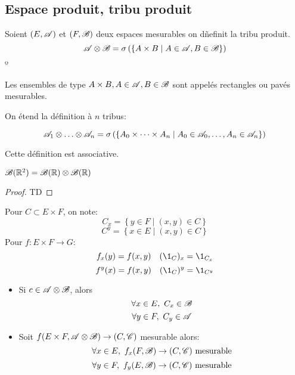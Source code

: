 \subsection{Espace produit, tribu produit}

\begin{definition}
	Soient $(E,\mathscr{A})$ et $(F,\mathscr{B})$ deux espaces mesurables on dñefinit la tribu produit.
	$$\mathscr{A} \otimes \mathscr{B} = \sigma \left(\left\{ A \times B \mid A\in \mathscr{A}, B \in \mathscr{B} \right\}\right)$$º
\end{definition}

\begin{remarque}
	Les ensembles de type $A\times B, A\in \mathscr{A}, B\in\mathscr{B}$ sont appelés rectangles ou pavés mesurables.
\end{remarque}


\begin{definition}
	On étend la définition à $n$ tribus:

	$$\triA_1 \xor \dots \xor \triA_n = \sigma \left(\left\{ A_0 \times \dots \times A_n \mid A_0\in \triA_0, \dots , A_n \in \triA_n \right\}\right)$$

	Cette définition est associative.
\end{definition}

\begin{prop}
	$\mathscr{B}(\mathbb{R}^2) = \mathscr{B}(\mathbb{R}) \otimes \mathscr{B}(\mathbb{R})$
\end{prop}

\begin{proof}
    TD %
\end{proof}

\begin{notation}
	Pour $C \subset E \times F$, on note:
	$$ C_x = \left\{ y \in F \mid (x,y) \in C \right\} $$
	$$ C^y = \left\{ x \in E \mid (x,y) \in C \right\} $$
	Pour $f: E \times F \to G$:
	$$f_x(y) = f(x,y) \quad (\1_C)_x = \1_{C_x}$$
	$$f^y(x) = f(x,y) \quad (\1_C)^y = \1_{C^y} $$
\end{notation}

\begin{prop}
	\begin{itemize}
		\item Si $c \in \mathscr{A} \otimes \mathscr{B}$, alors
		      $$\forall x \in E,\ C_x \in \mathscr{B}$$
		      $$\forall y \in F,\ C_y \in \mathscr{A}$$
		\item Soit $f (E\times F, \mathscr{A} \otimes \mathscr{B}) \to (C, \mathscr{C})$ mesurable alors:
		      $$\forall x \in E, \ f_x (F, \mathscr{B})  \to (C, \mathscr{C}) \text{ mesurable}$$
		      $$\forall y \in F, \ f_y (E, \mathscr{B})  \to (C, \mathscr{C}) \text{ mesurable}$$
	\end{itemize}
\end{prop}


